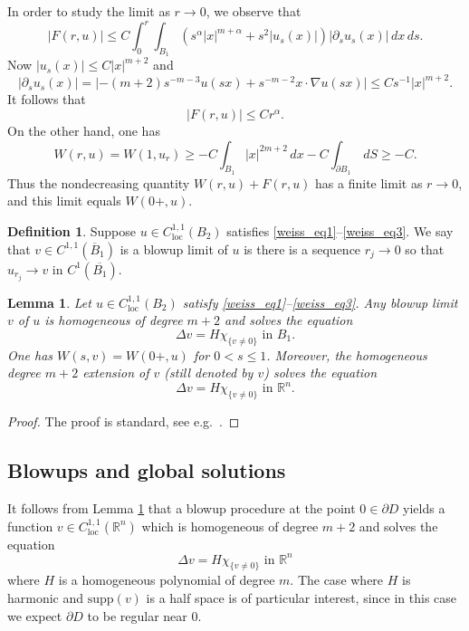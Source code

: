 \documentclass[11pt,a4paper]{amsart}
\newtheorem{Lemma}[Theorem]{Lemma}
\theoremstyle{definition}
\newtheorem{Definition}[Theorem]{Definition}
\numberwithin{equation}{section}
\newcommand{\mR}{\mathbb{R}}                    %
\newcommand{\abs}[1]{\lvert #1 \rvert}          %
\newcommand{\ol}[1]{\overline{#1}}
\newcommand{\p}{\partial}
\begin{document}
In order to study the limit as $r \to 0$, we observe that 
\[
\abs{F(r,u)} \leq C \int_0^r \int_{B_1} (s^{\alpha} \abs{x}^{m+\alpha} + s^2 \abs{u_s(x)}) \abs{\p_s u_s(x)} \,dx \,ds.
\]
Now $\abs{u_s(x)} \leq C \abs{x}^{m+2}$ and 
\[
\abs{\p_s u_s(x)} = \abs{-(m+2) s^{-m-3} u(sx) + s^{-m-2} x \cdot \nabla u(sx)} \leq C s^{-1} |x|^{m+2}.
\]
It follows that 
\[
\abs{F(r,u)} \leq C r^{\alpha}.
\]
On the other hand, one has 
\[
W(r,u) = W(1,u_r) \geq -C \int_{B_1} \abs{x}^{2m+2} \,dx - C \int_{\p B_1} \,dS \geq -C.
\]
Thus the nondecreasing quantity $W(r,u) + F(r,u)$ has a finite limit as $r \to 0$, and this limit equals $W(0+, u)$.

\begin{Definition}
Suppose $u \in C^{1,1}_{\mathrm{loc}}(B_2)$ satisfies \eqref{weiss_eq1}--\eqref{weiss_eq3}. We say that $v \in C^{1,1}(\ol{B}_1)$ is a blowup limit of $u$ is there is a sequence $r_j \to 0$ so that $u_{r_j} \to v$ in $C^1(\ol{B_1})$.
\end{Definition}

\begin{Lemma} \label{lemma_weiss_blowup}
Let $u \in C^{1,1}_{\mathrm{loc}}(B_2)$ satisfy \eqref{weiss_eq1}--\eqref{weiss_eq3}. Any blowup limit $v$ of $u$ is homogeneous of degree $m+2$ and solves the equation 
\[
\Delta v = H \chi_{\{ v \neq 0 \}} \text{ in $B_1$}.
\]
One has $W(s, v) = W(0+, u)$ for $0 < s \leq 1$. Moreover, the homogeneous degree $m+2$ extension of $v$ (still denoted by $v$) solves the equation 
\[
\Delta v = H \chi_{\{ v \neq 0 \}} \text{ in $\mR^n$}.
\]
\end{Lemma}
\begin{proof}
The proof is standard, see e.g.\ \cite[Lemma 16]{Yeressian}.
\end{proof}




\subsection{Blowups and global solutions}



It follows from Lemma \ref{lemma_weiss_blowup} that a blowup procedure at the point $0 \in \p D$ yields a function $v \in C^{1,1}_{\mathrm{loc}}(\mR^n)$ which is homogeneous of degree $m+2$ and solves the equation 
\[
\Delta v = H \chi_{\{ v \neq 0 \}} \text{ in $\mR^n$}
\]
where $H$ is a homogeneous polynomial of degree $m$. The case where $H$ is harmonic and $\mathrm{supp}(v)$ is a half space is of particular interest, since in this case  we expect $\p D$ to be regular near $0$.
\end{document}
